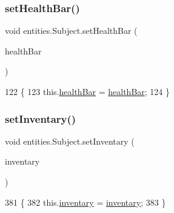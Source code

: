 \subsubsection{\texorpdfstring{set\+Health\+Bar()}{setHealthBar()}}
{\footnotesize\ttfamily void entities.\+Subject.\+set\+Health\+Bar (\begin{DoxyParamCaption}\item[{\mbox{\hyperlink{classgui_1_1_health_bar}{Health\+Bar}}}]{health\+Bar }\end{DoxyParamCaption})\hspace{0.3cm}{\ttfamily [inline]}}


\begin{DoxyCode}
122                                                   \{
123         this.\mbox{\hyperlink{classentities_1_1_subject_a3b3d023ad2be3c1de4b8d8de98556b3c}{healthBar}} = \mbox{\hyperlink{classentities_1_1_subject_a3b3d023ad2be3c1de4b8d8de98556b3c}{healthBar}};
124     \}
\end{DoxyCode}
\mbox{\label{classentities_1_1_subject_adf19d4419151e29ed50a9f1e138a2ee4}} 
\subsubsection{\texorpdfstring{set\+Inventary()}{setInventary()}}
{\footnotesize\ttfamily void entities.\+Subject.\+set\+Inventary (\begin{DoxyParamCaption}\item[{\mbox{\hyperlink{classitems_1_1_inventary}{Inventary}}}]{inventary }\end{DoxyParamCaption})\hspace{0.3cm}{\ttfamily [inline]}}


\begin{DoxyCode}
381                                                   \{
382         this.\mbox{\hyperlink{classentities_1_1_subject_a385ab8867c81188a3a092c3d8bd682fd}{inventary}} = \mbox{\hyperlink{classentities_1_1_subject_a385ab8867c81188a3a092c3d8bd682fd}{inventary}};
383     \}
\end{DoxyCode}
\mbox{\label{classentities_1_1_subject_a4bf16d3a7276dbd7c5ad2fbb22e7a125}} 
